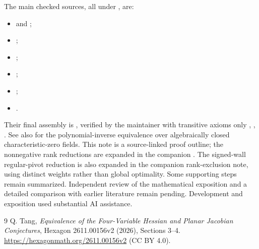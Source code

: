 \documentclass[11pt,a4paper]{article}
\begin{document}
The main checked sources, all under , are:
\begin{itemize}
\item {} and ;
\item {};
\item {};
\item {};
\item {};
\item {}.
\end{itemize}
Their final assembly is , verified by the maintainer with transitive axioms only , , . See also  for the polynomial-inverse equivalence over algebraically closed characteristic-zero fields. This note is a source-linked proof outline; the nonnegative rank reductions are expanded in the companion . The signed-wall regular-pivot reduction is also expanded in the companion rank-exclusion note, using distinct weights rather than global optimality. Some supporting steps remain summarized. Independent review of the mathematical exposition and a detailed comparison with earlier literature remain pending. Development and exposition used substantial AI assistance.
\begin{thebibliography}{9}
 Q. Tang, \emph{Equivalence of the Four-Variable Hessian and Planar Jacobian Conjectures}, Hexagon 2611.00156v2 (2026), Sections 3--4. \url{https://hexagonmath.org/2611.00156v2} (CC BY 4.0).
\end{thebibliography}
\end{document}
